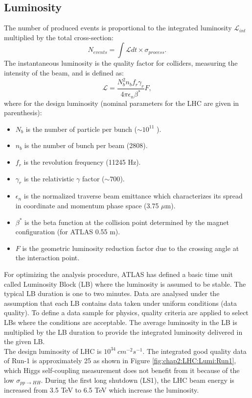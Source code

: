 \subsection{Luminosity}
\label{chap2:LHC:Lumi}
The number of produced events is proportional to the integrated luminosity $\mathcal{L}_{int}$ multiplied by the total cross-section: 
\begin{equation}
N_{events} = \int\mathcal{L} dt \times \sigma_{process}.
\end{equation}
The instantaneous luminosity is the quality factor for colliders, measuring the intensity of the beam, and is defined as:
\begin{equation}
\mathcal{L} = \frac{N_b^2n_bf_r\gamma_r}{4\pi\epsilon_n\beta^*}F,
\end{equation}
where for the design luminosity (nominal parameters for the LHC are given in parenthesis):
\begin{itemize}
	\item $N_b$ is the number of particle per bunch ($\sim10^{11}$ ).
	\item $n_b$ is the number of bunch per beam (2808).
	\item $f_r$ is the revolution frequency (11245 Hz).
	\item $\gamma_r$ is the relativistic $\gamma$ factor ($\sim 700$).
	\item $\epsilon_n$ is the normalized traverse beam emittance which characterizes its spread in coordinate and momentum phase space (3.75 $\mu$m).
	\item $\beta^*$ is the beta function at the collision point determined by the magnet configuration (for ATLAS 0.55 m).
	\item $F$ is the geometric luminosity reduction factor due to the crossing angle at the interaction point.
\end{itemize}
For optimizing the analysis procedure, ATLAS has defined a basic time unit called Luminosity Block (LB) where the luminosity is assumed to be stable. The typical LB duration is one to two minutes. Data are analysed under the assumption that each LB contains data taken under uniform conditions (data quality). To define a data sample for physics, quality criteria are applied to select LBs where the conditions are acceptable. The average luminosity in the LB is multiplied by the LB duration to provide the integrated luminosity delivered in the given LB. \\
The design luminosity of LHC is $10^{34} \ cm^{-2}s^{-1}$. The integrated good quality data of Run-1 is approximately 25 \ifb as shown in Figure \ref{fig:chap2:LHC:Lumi:Run1}, which Higgs self-coupling measurement does not benefit from it because of the low $\sigma_{pp\rightarrow HH}$. During the first long shutdown (LS1), the LHC beam energy is increased from 3.5 TeV to 6.5 TeV which increase the luminosity. 
